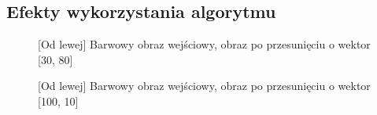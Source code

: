 \documentclass[a4paper,12pt, titlepage]{report}
\begin{document}
\subsection*{Efekty wykorzystania algorytmu}
\begin{figure}[h]
    \centering
    \caption{[Od lewej] Barwowy obraz wejściowy, obraz po przesunięciu o wektor [30, 80]}%
    \label{fig:rysunek}%
\end{figure}
\FloatBarrier
\begin{figure}[h]
    \centering
    \caption{[Od lewej] Barwowy obraz wejściowy, obraz po przesunięciu o wektor [100, 10]}%
    \label{fig:rysunek}%
\end{figure}
\FloatBarrier
\end{document}
